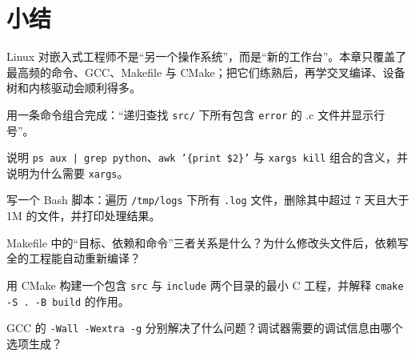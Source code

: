 \section{小结}

Linux 对嵌入式工程师不是“另一个操作系统”，而是“新的工作台”。本章只覆盖了最高频的命令、GCC、Makefile 与 CMake；把它们练熟后，再学交叉编译、设备树和内核驱动会顺利得多。

\begin{problemset}
\item 用一条命令组合完成：“递归查找 \texttt{src/} 下所有包含 \texttt{error} 的 .c 文件并显示行号”。
\item 说明 \texttt{ps aux | grep python}、\texttt{awk '\{print \$2\}'} 与 \texttt{xargs kill} 组合的含义，并说明为什么需要 \texttt{xargs}。
\item 写一个 Bash 脚本：遍历 \texttt{/tmp/logs} 下所有 \texttt{.log} 文件，删除其中超过 7 天且大于 1M 的文件，并打印处理结果。
\item Makefile 中的“目标、依赖和命令”三者关系是什么？为什么修改头文件后，依赖写全的工程能自动重新编译？
\item 用 CMake 构建一个包含 \texttt{src} 与 \texttt{include} 两个目录的最小 C 工程，并解释 \texttt{cmake -S . -B build} 的作用。
\item GCC 的 \texttt{-Wall -Wextra -g} 分别解决了什么问题？调试器需要的调试信息由哪个选项生成？
\end{problemset}
